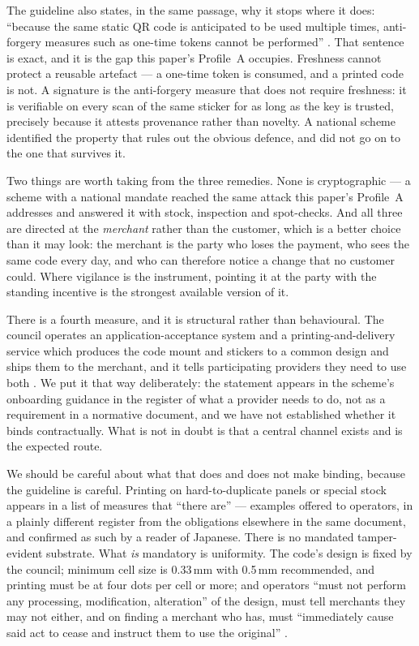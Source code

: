 \documentclass[10pt,a4paper,twocolumn]{article}
\begin{document}
The guideline also states, in the same passage, why it stops where it does:
``because the same static QR code is anticipated to be used multiple times,
anti-forgery measures such as one-time tokens cannot be performed''
\citep{jpqrmpm}. That sentence is exact, and it is the gap this paper's Profile~A
occupies. Freshness cannot protect a reusable artefact --- a one-time token is
consumed, and a printed code is not. A signature is the anti-forgery measure
that does not require freshness: it is verifiable on every scan of the same
sticker for as long as the key is trusted, precisely because it attests
provenance rather than novelty. A national scheme identified the property that
rules out the obvious defence, and did not go on to the one that survives it.

Two things are worth taking from the three remedies. None is cryptographic --- a
scheme with a national mandate reached the same attack this paper's Profile~A
addresses and answered it with stock, inspection and spot-checks. And all three
are directed at the \emph{merchant} rather than the customer, which is a better
choice than it may look: the merchant is the party who loses the payment, who
sees the same code every day, and who can therefore notice a change that no
customer could. Where vigilance is the instrument, pointing it at the party with
the standing incentive is the strongest available version of it.

There is a fourth measure, and it is structural rather than behavioural. The
council operates an application-acceptance system and a printing-and-delivery
service which produces the code mount and stickers to a common design and ships
them to the merchant, and it tells participating providers they need to use both
\citep{jpqrsite}. We put it that way deliberately: the statement appears in the
scheme's onboarding guidance in the register of what a provider needs to do, not
as a requirement in a normative document, and we have not established whether it
binds contractually. What is not in doubt is that a central channel exists and
is the expected route.

We should be careful about what that does and does not make binding, because the
guideline is careful. Printing on hard-to-duplicate panels or special stock appears in a list of
measures that ``there are'' --- examples offered to operators, in a
plainly different register from the obligations elsewhere in the same
document, and confirmed as such by a reader of Japanese. There is no mandated
tamper-evident substrate. What \emph{is}
mandatory is uniformity. The code's design is fixed by the council; minimum cell
size is 0.33\,mm with 0.5\,mm recommended, and printing must be at four dots per
cell or more; and operators ``must not perform any processing, modification,
alteration'' of the design, must tell merchants they may not either, and on
finding a merchant who has, must ``immediately cause said act to cease and
instruct them to use the original'' \citep{jpqrmpm}.
\end{document}
